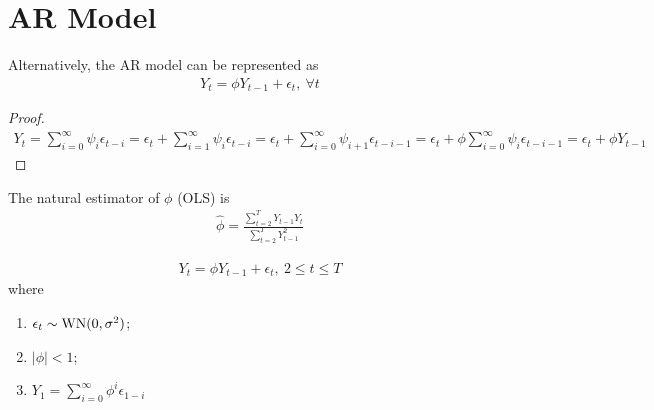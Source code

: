 \documentclass[11pt]{elegantbook}
\begin{document}
\section{AR Model}
\begin{definition}
    Alternatively, the AR model can be represented as
    \begin{equation}
        \begin{aligned}
            Y_t=\phi Y_{t-1}+\epsilon_t,\ \forall t
        \end{aligned}
        \nonumber
    \end{equation}
\end{definition}
\begin{proof}
    \begin{equation}
        \begin{aligned}
            Y_{t}=\sum_{i=0}^\infty \psi_i\epsilon_{t-i}=\epsilon_t+\sum_{i=1}^\infty \psi_i\epsilon_{t-i}=\epsilon_t+\sum_{i=0}^\infty \psi_{i+1}\epsilon_{t-i-1}=\epsilon_t+\phi\sum_{i=0}^\infty \psi_{i}\epsilon_{t-i-1}=\epsilon_t+\phi Y_{t-1}
        \end{aligned}
        \nonumber
    \end{equation}
\end{proof}

The natural estimator of $\phi$ (OLS) is
\begin{equation}
    \begin{aligned}
        \hat{\phi}=\frac{\sum_{t=2}^TY_{t-1}Y_t}{\sum_{t=2}^T Y_{t-1}^2}
    \end{aligned}
    \nonumber
\end{equation}



\begin{definition}
    \begin{equation}
        \begin{aligned}
            Y_t=\phi Y_{t-1}+\epsilon_t,\ 2\leq t\leq T
        \end{aligned}
        \nonumber
    \end{equation}
    where
    \begin{enumerate}[$\circ$]
        \item $\epsilon_t\sim \textnormal{WN}(0,\sigma^2)$;
        \item $|\phi|<1$;
        \item $Y_1=\sum_{i=0}^\infty \phi^i\epsilon_{1-i}$
    \end{enumerate}
\end{definition}
\end{document}
